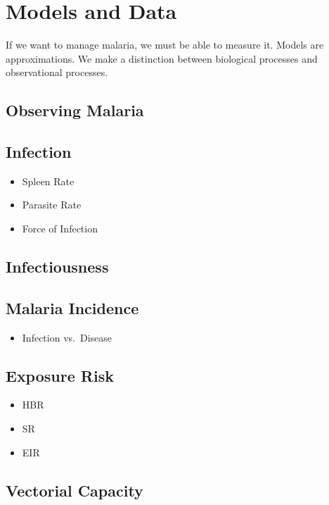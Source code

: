 \documentclass[
]{book}
\providecommand{\tightlist}{%
  \setlength{\itemsep}{0pt}\setlength{\parskip}{0pt}}
\begin{document}
\chapter{Models and Data}\label{models-and-data}

If we want to manage malaria, we must be able to measure it. Models are approximations. We make a distinction between biological processes and observational processes.

\section{Observing Malaria}\label{observing-malaria}

\section{Infection}\label{infection}

\begin{itemize}
\item
  Spleen Rate
\item
  Parasite Rate
\item
  Force of Infection
\end{itemize}

\section{Infectiousness}\label{infectiousness}

\section{Malaria Incidence}\label{malaria-incidence}

\begin{itemize}
\tightlist
\item
  Infection vs.~Disease
\end{itemize}

\section{Exposure Risk}\label{exposure-risk}

\begin{itemize}
\item
  HBR
\item
  SR
\item
  EIR
\end{itemize}

\section{Vectorial Capacity}\label{vectorial-capacity-1}
\end{document}
